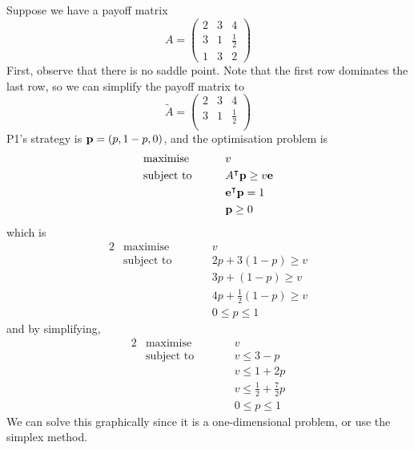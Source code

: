 \begin{example}
	Suppose we have a payoff matrix
	\[
		A = \begin{pmatrix}
			2 & 3 & 4           \\
			3 & 1 & \frac{1}{2} \\
			1 & 3 & 2
		\end{pmatrix}
	\]
	First, observe that there is no saddle point.
	Note that the first row dominates the last row, so we can simplify the payoff matrix to
	\[
		\widetilde{A} = \begin{pmatrix}
			2 & 3 & 4           \\
			3 & 1 & \frac{1}{2} \\
		\end{pmatrix}
	\]
	P1's strategy is \( \vb p = (p, 1-p, 0) \), and the optimisation problem is
	\begin{alignat*}{2}
		 & \text{maximise}   & \qquad & v                                           \\
		 & \text{subject to} &        & A^\intercal \vb p \geq v \vb e \\
		 &                   &        & \vb e^\intercal \vb p = 1                  \\
		 &                   &        & \vb p \geq 0
	\end{alignat*}
	which is
	\begin{alignat*}{2}
		 & \text{maximise}   & \qquad & v                            \\
		 & \text{subject to} &        & 2p + 3(1-p) \geq v           \\
		 &                   &        & 3p + (1-p) \geq v            \\
		 &                   &        & 4p + \frac{1}{2}(1-p) \geq v \\
		 &                   &        & 0 \leq p \leq 1
	\end{alignat*}
	and by simplifying,
	\begin{alignat*}{2}
		 & \text{maximise}   & \qquad & v                                 \\
		 & \text{subject to} &        & v \leq 3 - p                      \\
		 &                   &        & v \leq 1 + 2p                     \\
		 &                   &        & v \leq \frac{1}{2} + \frac{7}{2}p \\
		 &                   &        & 0 \leq p \leq 1
	\end{alignat*}
	We can solve this graphically since it is a one-dimensional problem, or use the simplex method.

\end{example}
